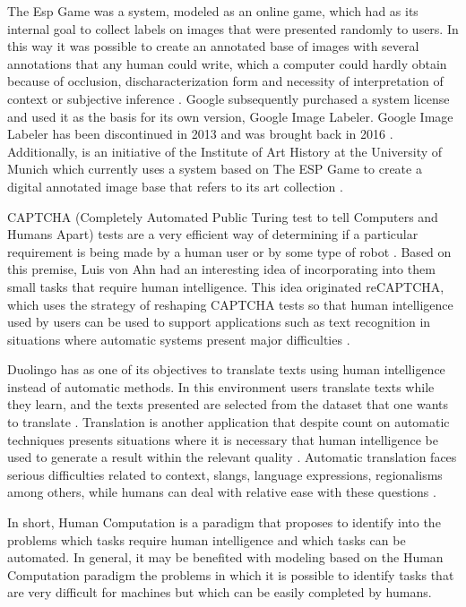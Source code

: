 The Esp Game was a system, modeled as an online game, which had as its internal goal to collect labels on images that were presented randomly to users. In this way it was possible to create an annotated base of images with several annotations that any human could write, which a computer could hardly obtain because of occlusion, discharacterization form and necessity of interpretation of context or subjective inference \cite{Robertson:2009:REG:1520340.1520597,vonAhn:2008:DGP:1378704.1378719}. Google subsequently purchased a system license and used it as the basis for its own version, Google Image Labeler\cite{1_saini_2017}. Google Image Labeler has been discontinued in 2013 and was brought back in 2016 \cite{3_backchitu_2017}.  Additionally, is an initiative of the Institute of Art History at the University of Munich which currently uses a system based on The ESP Game to create a digital annotated image base that refers to its art collection \cite{2_muumlnchen_2017}.


CAPTCHA (Completely Automated Public Turing test to tell Computers and Humans Apart) tests are a very efficient way of determining if a particular requirement is being made by a human user or by some type of robot \cite{Simmons:2010:PLV:1869086.1869102}. Based on this premise, Luis von Ahn had an interesting idea of incorporating into them small tasks that require human intelligence. This idea originated reCAPTCHA, which uses the strategy of reshaping CAPTCHA tests so that human intelligence used by users can be used to support applications such as text recognition in situations where automatic systems present major difficulties  \cite{Ahn08recaptcha:human-based}.

Duolingo has as one of its objectives to translate texts using human intelligence instead of automatic methods. In this environment users translate texts while they learn, and the texts presented are selected from the dataset that one wants to translate \cite{vonAhn:2011:THC}. Translation is another application that despite count on automatic techniques presents situations where it is necessary that human intelligence be used to generate a result within the relevant quality \cite{bywood2017embracing}. Automatic translation faces serious difficulties related to context, slangs, language expressions, regionalisms among others, while humans can deal with relative ease with these questions \cite{guerra2000machine}.

In short, Human Computation is a paradigm that proposes to identify into the problems which tasks require human intelligence and which tasks can be automated. In general, it may be benefited with modeling based on the Human Computation paradigm the problems in which it is possible to identify tasks that are very difficult for machines but which can be easily completed by humans.


